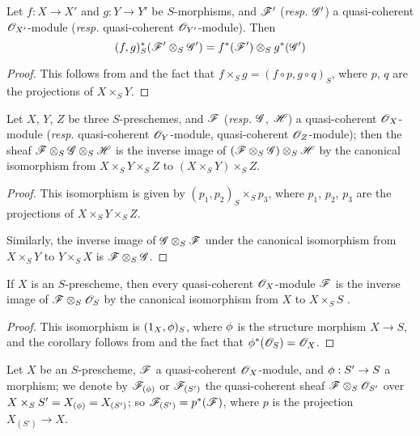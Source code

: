 \begin{cor}[9.1.5]
\label{1.9.1.5}
Let $f:X\to X'$ and $g:Y\to Y'$ be
$S$-morphisms, and $\mathscr{F}'$ (\emph{resp.} $\mathscr{G}'$) a quasi-coherent
$\mathscr{O}_{X'}$-module (\emph{resp.} quasi-coherent $\mathscr{O}_{Y'}$-module). Then
\[
  (f,g)^*_S(\mathscr{F}'\otimes_S\mathscr{G}')=f^*(\mathscr{F}')\otimes_S g^*(\mathscr{G}')
\]
\end{cor}

\begin{proof}
\label{proof-1.9.1.5}
This follows from  and the fact that $f\times_S g=(f\circ p, g\circ q)_S$,
where $p$, $q$ are the projections of $X\times_S Y$.
\end{proof}

\begin{cor}[9.1.6]
\label{1.9.1.6}
Let $X$, $Y$, $Z$ be three $S$-preschemes, and $\mathscr{F}$ (\emph{resp.} $\mathscr{G}$, $\mathscr{H}$) a
quasi-coherent $\mathscr{O}_X$-module (\emph{resp.} quasi-coherent $\mathscr{O}_Y$-module, quasi-coherent
$\mathscr{O}_Z$-module); then the sheaf $\mathscr{F}\otimes_S\mathscr{G}\otimes_S\mathscr{H}$ is the inverse image
of $(\mathscr{F}\otimes_S\mathscr{G})\otimes_S\mathscr{H}$ by the canonical isomorphism from
$X\times_S Y\times_S Z$ to $(X\times_S Y)\times_S Z$.
\end{cor}

\begin{proof}
\label{proof-1.9.16}
This isomorphism is given by $(p_1,p_2)_S\times_S p_3$, where $p_1$, $p_2$, $p_3$
are the projections of $X\times_S Y\times_S Z$.

Similarly, the inverse image of $\mathscr{G}\otimes_S\mathscr{F}$ under the canonical isomorphism from
$X\times_S Y$ to $Y\times_S X$ is $\mathscr{F}\otimes_S\mathscr{G}$.
\end{proof}

\begin{cor}[9.1.7]
\label{1.9.1.7}
If $X$ is an $S$-prescheme, then every quasi-coherent $\mathscr{O}_X$-module $\mathscr{F}$ is the inverse
image of $\mathscr{F}\otimes_S\mathscr{O}_S$ by the canonical isomorphism from $X$ to $X\times_S S$
.
\end{cor}

\begin{proof}
\label{proof-1.9.1.7}
This isomorphism is $(1_X,\phi)_S$, where $\phi$ is the structure morphism
$X\to S$, and the corollary follows from  and the fact that
$\phi^*(\mathscr{O}_S)=\mathscr{O}_X$.
\end{proof}

\begin{env}[9.1.8]
\label{1.9.1.8}
Let $X$ be an $S$-prescheme, $\mathscr{F}$ a quasi-coherent
$\mathscr{O}_X$-module, and $\vphi:S'\to S$ a morphism; we denote by
$\mathscr{F}_{(\phi)}$ or $\mathscr{F}_{(S')}$ the quasi-coherent sheaf
$\mathscr{F}\otimes_S\mathscr{O}_{S'}$ over $X\times_S S'=X_{(\phi)}=X_{(S')}$; so
$\mathscr{F}_{(S')}=p^*(\mathscr{F})$, where $p$ is the projection $X_{(S')}\to X$.
\end{env}

